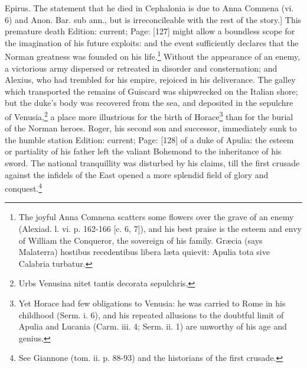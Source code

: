 {Epirus. The statement that he died in Cephalonia is due to Anna Comnena (vi. 6) and Anon. Bar. sub ann., but is irreconcileable with the rest of the story.]} This premature death Edition: current; Page: [127] might allow a boundless scope for the imagination of his future exploits: and the event sufficiently declares that the Norman greatness was founded on his life.\footnote{The joyful Anna Comnena scatters some flowers over the grave of an enemy (Alexiad. l. vi. p. 162-166 [c. 6, 7]), and his best praise is the esteem and envy of William the Conqueror, the sovereign of his family. Græcia (says Malaterra) hostibus recedentibus libera læta quievit: Apulia tota sive Calabria turbatur.} Without the appearance of an enemy, a victorious army dispersed or retreated in disorder and consternation; and Alexius, who had trembled for his empire, rejoiced in his deliverance. The galley which transported the remains of Guiscard was shipwrecked on the Italian shore; but the duke\texthebrew{}’s body was recovered from the sea, and deposited in the sepulchre of Venusia,\footnote{Urbs Venusina nitet tantis decorata sepulchris,} a place more illustrious for the birth of Horace\footnote{Yet Horace had few obligations to Venusia: he was carried to Rome in his childhood (Serm. i. 6), and his repeated allusions to the doubtful limit of Apulia and Lucania (Carm. iii. 4; Serm. ii. 1) are unworthy of his age and genius.} than for the burial of the Norman heroes. Roger, his second son and successor, immediately sunk to the humble station Edition: current; Page: [128] of a duke of Apulia: the esteem or partiality of his father left the valiant Bohemond to the inheritance of his sword. The national tranquillity was disturbed by his claims, till the first crusade against the infidels of the East opened a more splendid field of glory and conquest.\footnote{See Giannone (tom. ii. p. 88-93) and the historians of the first crusade.}

